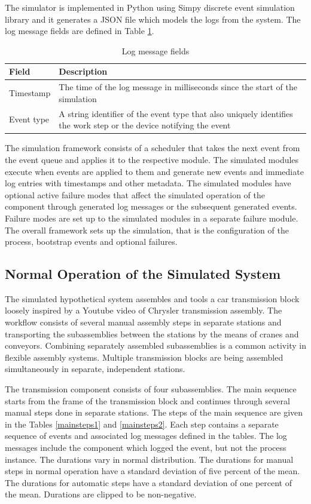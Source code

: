 \documentclass[journal]{IEEEtran}
\begin{document}
The simulator is implemented in Python using Simpy discrete event simulation library and it generates a JSON file which models the logs from the system.
The log message fields are defined in Table \ref{fields}.

\begin{table}[!t]
\renewcommand{\arraystretch}{1.3}
\caption{Log message fields}
\label{fields}
\centering
\begin{tabular}{|p{25mm}|p{45mm}|}
\hline
Field & Description \\
\hline
\hline
Timestamp & The time of the log message in milliseconds since the start of the simulation \\
\hline
Event type & A string identifier of the event type that also uniquely identifies the work step or the device notifying the event \\
\hline
\end{tabular}
\end{table}

The simulation framework consists of a scheduler that takes the next event from the event queue and applies it to the respective module. The simulated modules
execute when events are applied to them and generate new events and immediate log entries with timestamps and other metadata.
The simulated modules have optional active failure modes that affect the simulated operation of the component through
generated log messages or the subsequent generated events. Failure modes are set up to the simulated modules in a separate failure module.
The overall framework sets up the simulation, that is the configuration of the process, bootstrap events and optional failures.

\subsection{Normal Operation of the Simulated System}
The simulated hypothetical system assembles and tools a car transmission block loosely inspired by a Youtube video of Chrysler transmission assembly\cite{transmission}.
The workflow consists of several manual assembly steps in separate stations and transporting the subassemblies between the stations by the means of
cranes and conveyors. Combining separately assembled subassemblies is a common activity in flexible assembly systems\cite{el1989simulation}.
Multiple transmission blocks are being assembled simultaneously in separate, independent stations.

The transmission component consists of four subassemblies. The main sequence starts from the frame of the transmission block
and continues through several manual steps done in separate stations. The steps of the main sequence are given in
the Tables \ref{mainsteps1} and \ref{mainsteps2}.
Each step contains a separate sequence of events and associated log messages defined in the tables. The log messages include the component which logged the event, but
not the process instance.
The durations vary in normal distribution. The durations for manual steps in normal operation have a standard deviation of five percent of the mean. The durations for automatic steps
have a standard deviation of one percent of the mean. Durations are clipped to be non-negative.
\end{document}
